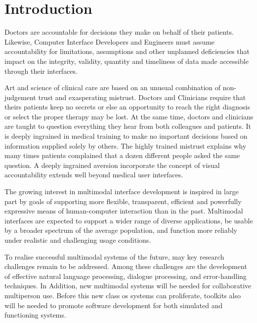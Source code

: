 \begin{titlepage}

\vfill %

\end{titlepage}

\section{Introduction}

Doctors are accountable for decisions they make on behalf of their patients. Likewise, Computer Interface Developers and Engineers must assume accountability for limitations, assumptions and other unplanned deficiencies that impact on the integrity, validity, quantity and timeliness of data made accessible through their interfaces.

Art and science of clinical care are based on an unusual combination of non-judgement trust and exasperating mistrust. Doctors and Clinicians require that theirs patients keep no secrets or else an opportunity to reach the right diagnosis or select the proper therapy may be lost. At the same time, doctors and clinicians are taught to question everything they hear from both colleagues and patients. It is deeply ingrained in medical training to make no important decisions based on information supplied solely by others. The highly trained mistrust explains why many times patients complained that a dozen different people asked the same question. A deeply ingrained aversion incorporate the concept of visual accountability extends well beyond medical user interfaces.

The growing interest in multimodal interface development is inspired in large part by goals of supporting more flexible, transparent, efficient and powerfully expressive means of human-computer interaction than in the past. Multimodal interfaces are expected to support a wider range of diverse applications, be usable by a broader spectrum of the average population, and function more reliably under realistic and challenging usage conditions.

To realise successful multimodal systems of the future, may key research challenges remain to be addressed. Among these challenges are the development of effective natural language processing, dialogue processing, and error-handling techniques. In Addition, new multimodal systems will be needed for collaborative multiperson use. Before this new class os systems can proliferate, toolkits also will be needed to promote software development for both simulated and functioning systems.

